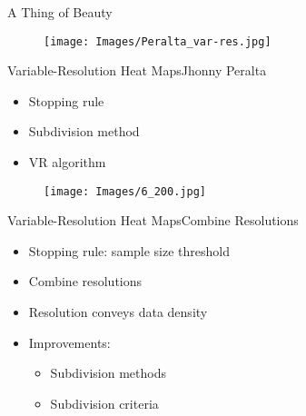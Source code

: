 \documentclass{beamer}
\begin{document}
\begin{frame}{A Thing of Beauty}{}
  \begin{figure}[H]
	\centering
	\texttt{[image: Images/Peralta\_var-res.jpg]}
	\label{fig:interp}
  \end{figure}
\end{frame}

\begin{frame}{Variable-Resolution Heat Maps}{Jhonny Peralta}
\begin{itemize}
\item Stopping rule
\item Subdivision method
\item VR algorithm
\end{itemize}
  \begin{figure}[H]
	\centering
	\texttt{[image: Images/6\_200.jpg]}
	\end{figure}
\end{frame}



\begin{frame}{Variable-Resolution Heat Maps}{Combine Resolutions}
\begin{itemize}
\addtolength{\itemsep}{0.5\baselineskip}
\item Stopping rule: sample size threshold
\item Combine resolutions
\item Resolution conveys data density
\item Improvements:
  \begin{itemize}
  \addtolength{\itemsep}{0.5\baselineskip}
  \item Subdivision methods
  \item Subdivision criteria
  \end{itemize}
\end{itemize}
\end{frame}
\end{document}
